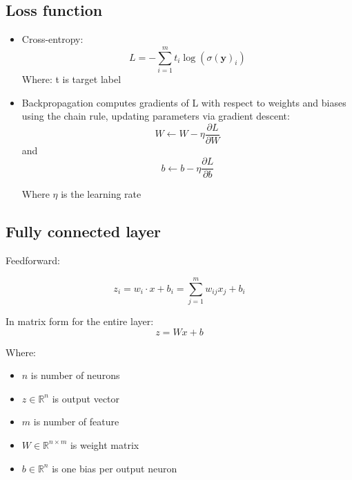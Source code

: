 \documentclass[journal]{IEEEtran} %
\begin{document}
\subsection{Loss function}
\begin{itemize}
    \item Cross-entropy:
        \begin{equation}
            L = -\sum_{i=1}^m t_i \log(\sigma(\mathbf{y})_i)
        \end{equation}
        Where: t is target label
        \\

    \item Backpropagation computes gradients of L with respect to weights and biases using the chain rule, updating parameters via gradient descent:
        \begin{equation}
            W \leftarrow W - \eta \frac{\partial L}{\partial W}
        \end{equation}
        and
        \begin{equation}
            b \leftarrow b - \eta \frac{\partial L}{\partial b}
        \end{equation}

        Where $\eta$ is the learning rate
    
\end{itemize}

\subsection{Fully connected layer}
Feedforward:

\begin{equation}
    z_i = w_i \cdot x + b_i = \sum_{j=1}^{m} w_{ij} x_j + b_i
\end{equation}

In matrix form for the entire layer:
\begin{equation}
    z = Wx + b
\end{equation}

Where:
\begin{itemize}
    \item \( n \) is number of neurons
    \item \( z \in \mathbb{R}^n \) is output vector
    \item \( m \) is number of feature
    \item \( W \in \mathbb{R}^{n \times m} \) is weight matrix
    \item \( b \in \mathbb{R}^n \) is one bias per output neuron
\end{itemize}
\end{document}

